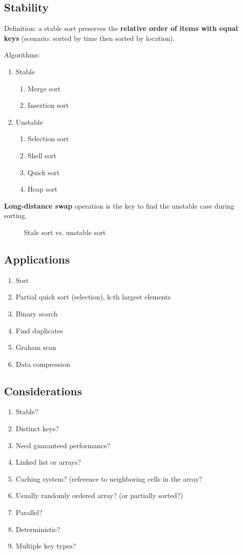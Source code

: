\subsection{Stability}
Definition: a stable sort preserves the \textbf{relative order of items with equal keys} (scenario: sorted by time then sorted by location). 

Algorithms:
\begin{enumerate}
\item Stable
\begin{enumerate}
\item Merge sort
\item Insertion sort
\end{enumerate} 
\item Unstable
\begin{enumerate}
\item Selection sort
\item Shell sort
\item Quick sort
\item Heap sort
\end{enumerate}
\end{enumerate}
\textbf{Long-distance swap} operation is the key to find the unstable case during sorting. 
\begin{figure}[hbtp]
\centering
{}
\caption{Stale sort vs. unstable sort}
\label{fig:trie} 
\end{figure}

\subsection{Applications}
\begin{enumerate}
\item Sort
\item Partial quick sort (selection), k-th largest elements 
\item Binary search
\item Find duplicates 
\item Graham scan
\item Data compression
\end{enumerate}

\subsection{Considerations}
\begin{enumerate}
\item Stable?
\item Distinct keys?
\item Need guaranteed performance?
\item Linked list or arrays?
\item Caching system? (reference to neighboring cells in the array? 
\item Usually randomly ordered array?
(or partially sorted?)\item Parallel?
\item Deterministic?
\item Multiple key types?
\end{enumerate}

